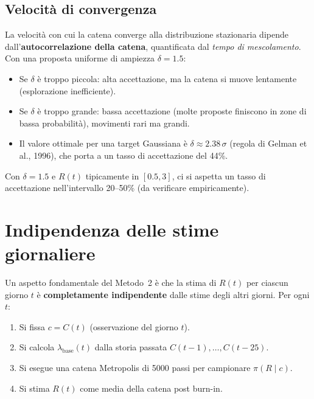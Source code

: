 \documentclass[12pt,a4paper]{article}
\newcommand{\lbase}{\lambda_{\mathrm{base}}}
\begin{document}
\subsection{Velocità di convergenza}

La velocità con cui la catena converge alla distribuzione stazionaria dipende
dall'\textbf{autocorrelazione della catena}, quantificata dal \emph{tempo di mescolamento}.
Con una proposta uniforme di ampiezza $\delta = 1.5$:

\begin{itemize}
  \item Se $\delta$ è troppo piccola: alta accettazione, ma la catena si muove lentamente
        (esplorazione inefficiente).
  \item Se $\delta$ è troppo grande: bassa accettazione (molte proposte finiscono in zone
        di bassa probabilità), movimenti rari ma grandi.
  \item Il valore ottimale per una target Gaussiana è $\delta \approx 2.38\,\sigma$
        (regola di Gelman et al., 1996), che porta a un tasso di accettazione del 44\%.
\end{itemize}

Con $\delta = 1.5$ e $R(t)$ tipicamente in $[0.5, 3]$, ci si aspetta un tasso di
accettazione nell'intervallo 20--50\% (da verificare empiricamente).

\section{Indipendenza delle stime giornaliere}

Un aspetto fondamentale del Metodo~2 è che la stima di $R(t)$ per ciascun giorno $t$
è \textbf{completamente indipendente} dalle stime degli altri giorni. Per ogni $t$:

\begin{enumerate}
  \item Si fissa $c = C(t)$ (osservazione del giorno $t$).
  \item Si calcola $\lbase(t)$ dalla storia passata $C(t-1), \ldots, C(t-25)$.
  \item Si esegue una catena Metropolis di 5000 passi per campionare $\pi(R \mid c)$.
  \item Si stima $R(t)$ come media della catena post burn-in.
\end{enumerate}
\end{document}
